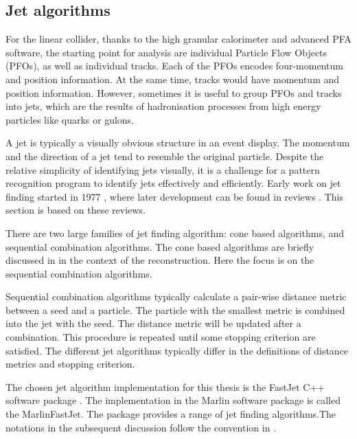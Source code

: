 \subsection{Jet algorithms}
\label{sec:pandoraJetAlg}

For the linear collider, thanks to the high granular calorimeter and advanced PFA software, the starting point for analysis are individual Particle Flow Objects (PFOs), as well as individual tracks. Each of the PFOs encodes four-momentum and position information. At the same time, tracks would have momentum and position information. However, sometimes it is useful to group PFOs and tracks into jets, which are the results of hadronisation processes from high energy particles like quarks or gulons.

A jet is typically a visually obvious structure in an event display. The momentum and the direction of a jet tend to resemble the original particle. Despite the relative simplicity of identifying jets visually, it is a challenge for a pattern recognition program to identify jets effectively and efficiently. Early work on jet finding started in 1977 \cite{Sterman:1977wj}, where later development can be found in reviews \cite{Moretti:1998qx,Salam:2009jx,Ali:2010tw}. This section is based on these reviews.

There are two large families of jet finding algorithm: cone based algorithms, and sequential combination algorithms. The cone based algorithms are briefly discussed in  in the context of the \pandora reconstruction. Here the focus is on the sequential combination algorithms.

Sequential combination algorithms typically calculate a pair-wise distance metric between a seed and a particle. The particle with the smallest metric is combined into the jet with the seed. The distance metric will be updated after a combination. This procedure is repeated until some stopping criterion are satisfied. The different jet algorithms typically differ in the definitions of  distance metrics and stopping criterion.

The chosen jet algorithm implementation for this thesis is the FastJet C++ software package \cite{Cacciari:2011ma,Cacciari:2005hq}. The implementation in the Marlin software package is called the MarlinFastJet. The package provides a range of jet finding algorithms.The notations in the subsequent discussion follow the convention in \cite{Cacciari:2011ma}.

